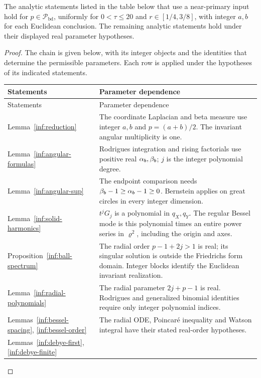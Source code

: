 \begin{proposition}\label{inf:parity-chain}
The analytic statements listed in the table below that use a
near-primary input hold for
$p\in\mathcal P_{\mathrm{bd}}$, uniformly for $0<\tau\le20$ and
$r\in[1/4,3/8]$, with integer $a,b$ for each Euclidean conclusion.
The remaining analytic statements hold under their displayed real
parameter hypotheses.
\end{proposition}
\begin{proof}
The chain is given below, with its integer objects and the identities
that determine the permissible parameters. Each row is applied under
the hypotheses of its indicated statements.
\begingroup\small\normalfont
\renewcommand{\arraystretch}{1.12}
\begin{longtable}{@{}>{\raggedright\arraybackslash}p{}>{\raggedright\arraybackslash}p{}@{}}
\toprule Statements & Parameter dependence\\\midrule
\endfirsthead
\toprule Statements & Parameter dependence\\\midrule
\endhead
Lemma~\ref{inf:reduction} &
The coordinate Laplacian and beta measure use integer $a,b$ and
$p=(a+b)/2$. The invariant angular multiplicity is one.\\
Lemma~\ref{inf:angular-formulas} &
Rodrigues integration and rising factorials use positive real
$\alpha_b,\beta_b$; $j$ is the integer polynomial degree.\\
Lemma~\ref{inf:angular-sup} &
The endpoint comparison needs $\beta_b-1\ge\alpha_b-1\ge0$.
Bernstein applies on great circles in every integer dimension.\\
Lemma~\ref{inf:solid-harmonics} &
$t^jG_j$ is a polynomial in $q_X,q_Y$.
The regular Bessel mode is this polynomial times an entire power
series in $\varrho^2$, including the origin and axes.\\
Proposition~\ref{inf:ball-spectrum} &
The radial order $p-1+2j>1$ is real; its singular solution is
outside the Friedrichs form domain. Integer blocks identify the
Euclidean invariant realization.\\
Lemma~\ref{inf:radial-polynomials} &
The radial parameter $2j+p-1$ is real. Rodrigues and generalized
binomial identities require only integer polynomial indices.\\
Lemmas~\ref{inf:bessel-spacing}, \ref{inf:bessel-order} &
The radial ODE, Poincar\'e inequality and Watson integral have
their stated real-order hypotheses.\\
Lemmas~\ref{inf:debye-first}, \ref{inf:debye-finite} &

\end{longtable}
\end{proof}
